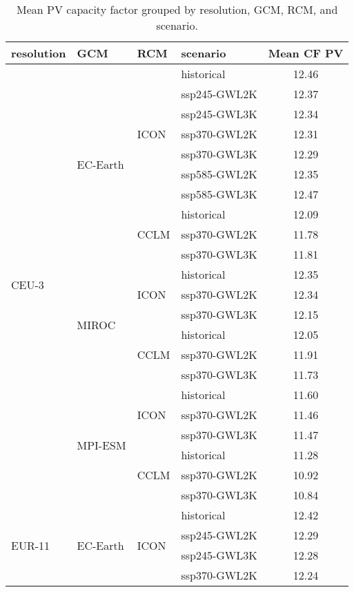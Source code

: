 \begin{table}[!htbp]
\centering
\caption{Mean PV capacity factor grouped by resolution, GCM, RCM, and scenario.}
\label{Table:CF_PV_changes}
\begin{tabular}{lll|l|c}
\toprule
resolution & GCM & RCM & scenario & Mean CF PV \\
\midrule
\multirow{22}{*}{CEU-3} & \multirow{10}{*}{EC-Earth} & \multirow{7}{*}{ICON} & historical & 12.46 \\
 &  &  & ssp245-GWL2K & 12.37 \\
 &  &  & ssp245-GWL3K & 12.34 \\
 &  &  & ssp370-GWL2K & 12.31 \\
 &  &  & ssp370-GWL3K & 12.29 \\
 &  &  & ssp585-GWL2K & 12.35 \\
 &  &  & ssp585-GWL3K & 12.47 \\
\cmidrule(lr){3-5}
 &  & \multirow{3}{*}{CCLM} & historical & 12.09 \\
 &  &  & ssp370-GWL2K & 11.78 \\
 &  &  & ssp370-GWL3K & 11.81 \\
\cmidrule(lr){3-5}
\cmidrule(lr){2-5}
 & \multirow{6}{*}{MIROC} & \multirow{3}{*}{ICON} & historical & 12.35 \\
 &  &  & ssp370-GWL2K & 12.34 \\
 &  &  & ssp370-GWL3K & 12.15 \\
\cmidrule(lr){3-5}
 &  & \multirow{3}{*}{CCLM} & historical & 12.05 \\
 &  &  & ssp370-GWL2K & 11.91 \\
 &  &  & ssp370-GWL3K & 11.73 \\
\cmidrule(lr){3-5}
\cmidrule(lr){2-5}
 & \multirow{6}{*}{MPI-ESM} & \multirow{3}{*}{ICON} & historical & 11.60 \\
 &  &  & ssp370-GWL2K & 11.46 \\
 &  &  & ssp370-GWL3K & 11.47 \\
\cmidrule(lr){3-5}
 &  & \multirow{3}{*}{CCLM} & historical & 11.28 \\
 &  &  & ssp370-GWL2K & 10.92 \\
 &  &  & ssp370-GWL3K & 10.84 \\
\midrule
\multirow{22}{*}{EUR-11} & \multirow{10}{*}{EC-Earth} & \multirow{7}{*}{ICON} & historical & 12.42 \\
 &  &  & ssp245-GWL2K & 12.29 \\
 &  &  & ssp245-GWL3K & 12.28 \\
 &  &  & ssp370-GWL2K & 12.24 \\

\end{tabular}
\end{table}

